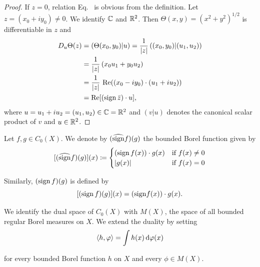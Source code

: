 \begin{proof}
If\/ $z = 0$, relation Eq.~ is obvious from the definition.
Let $z = (x_{0} + iy_{0}) \neq 0$.
We identify $\mathbb{C}$ and $\mathbb{R}^2$.
Then $\Theta(x,y) = (x^2 + y^2)^{1/2}$ is differentiable in $z$ and
\begin{align*}
D_{u}\Theta(z) &= (\Theta(x_{0},y_{0})|u) = \frac{1}{|z|}\, ((x_{0},y_{0})|(u_{1},u_{2}))  \\
               &= \frac{1}{|z|}\, (x_{0}u_{1} + y_{0}u_{2}) \\
               &= \frac{1}{|z|}\, \mathop{}\!\mathrm{Re}((x_{0}-iy_{0})\cdot(u_{1}+iu_{2})) \\
               &= \mathop{}\!\mathrm{Re}[(\operatorname{sign} \bar{z})\cdot u],
\end{align*}
where $u = u_{1} + iu_{2} = (u_{1},u_{2}) \in \mathbb{C} = \mathbb{R}^2$ and $(v|u)$ denotes the canonical scalar product of\/ 
$v$ and $u \in \mathbb{R}^2$.
\end{proof}
Let $f, g \in C_{0}(X)$.
We denote by $(\widehat{\operatorname{sign}} f)(g)$ the bounded Borel function given by
\begin{equation}\label{eq:b2-2.7}
[(\widehat{\operatorname{sign}} f)(g)](x) \coloneq \begin{cases}
    (\operatorname{sign} f(x))\cdot g(x) & \text{if } f(x) \neq 0 \\
    |g(x)| & \text{if } f(x) = 0
\end{cases}
\end{equation}

Similarly, $(\operatorname{sign} f)(g)$ is defined by
\begin{equation}\label{eq:b2-2.8}
[(\operatorname{sign} f)(g)](x) = ({\operatorname{sign}} f(x))\cdot g(x).
\end{equation}

We identify the dual space of\/ $C_{0}(X)$ with $M(X)$, the space of all bounded regular Borel measures on $X$.
We extend the duality by setting
\begin{equation*}
\langle h,\phi \rangle = \int h(x)   \diff\phi(x)
\end{equation*}

for every bounded Borel function $h$ on $X$ and every $\phi \in M(X)$.

